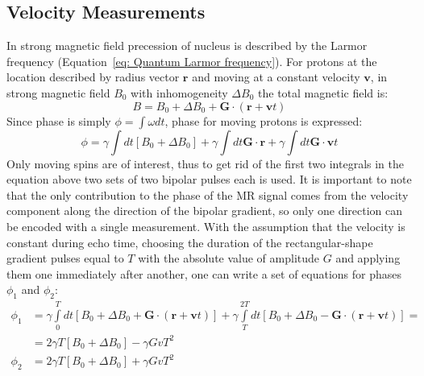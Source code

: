 \subsection{Velocity Measurements}
In strong magnetic field precession of nucleus is described by the Larmor frequency (Equation~\ref{eq: Quantum Larmor frequency}).
For protons at the location described by radius vector $\mathbf{r}$ and moving at a constant velocity $\mathbf{v}$, in strong magnetic field $B_0$ with inhomogeneity $\Delta B_0$ the total magnetic field is:
\begin{equation}\label{eq: field B vepc}
B=B_0+\Delta B_0 + \mathbf{G} \cdot(\mathbf r + \mathbf v t)
\end{equation}
Since phase is simply $\phi=\int\omega dt$, phase for moving protons is expressed:
\begin{equation}\label{eq: phas vepc }
\phi = \gamma \int dt [B_0+\Delta B_0] + \gamma\int dt \mathbf{G} \cdot \mathbf{r}  + \gamma\int dt\mathbf{G} \cdot \mathbf v t 
\end{equation}
Only moving spins are of interest, thus to get rid of the first two integrals in the equation above two sets of two bipolar pulses each is used.
It is important to note that the only contribution to the phase of the MR signal comes from the velocity component along the direction of the bipolar gradient, so only one direction can be encoded with a single measurement. 
With the assumption that the velocity is constant during echo time, choosing the duration of the rectangular-shape gradient pulses equal to $T$ with the absolute value of amplitude $G$ and applying them one immediately after another, one can write a set of equations for phases $\phi_1$ and $\phi_2$: 
\begin{equation}\label{eq: phase vepc}
\begin{split}
\phi_1 &{} = \gamma \int\limits_{0}^{T} dt [B_0+\Delta B_0+\mathbf{G} \cdot (\mathbf r + \mathbf v t)]  + \gamma \int\limits_{T}^{2T} dt [B_0+\Delta B_0-\mathbf{G} \cdot (\mathbf{r} + \mathbf v t)] =\\
&{} =2\gamma T[B_0+\Delta B_0] - \gamma Gv T^2\\[10pt]
\phi_2 &{} =2\gamma T[B_0+\Delta B_0] + \gamma G v T^2
\end{split}
\end{equation}
